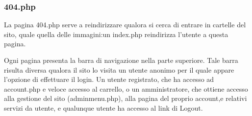 \subsubsection{404.php} \Spazio
La pagina 404.php serve a reindirizzare qualora si cerca di entrare in cartelle del sito, quale quella delle immagini:un index.php reindirizza l'utente a questa pagina.


Ogni pagina presenta la barra di navigazione nella parte superiore. Tale barra risulta diversa qualora il sito lo visita un utente anonimo per il quale appare l'opzione di effettuare il login. Un utente registrato, che ha accesso ad account.php e veloce accesso al carrello, o un amministratore, che ottiene accesso alla gestione del sito (adminmenu.php), alla pagina del proprio account,e relativi servizi da utente, e qualunque utente ha accesso al link di Logout.

